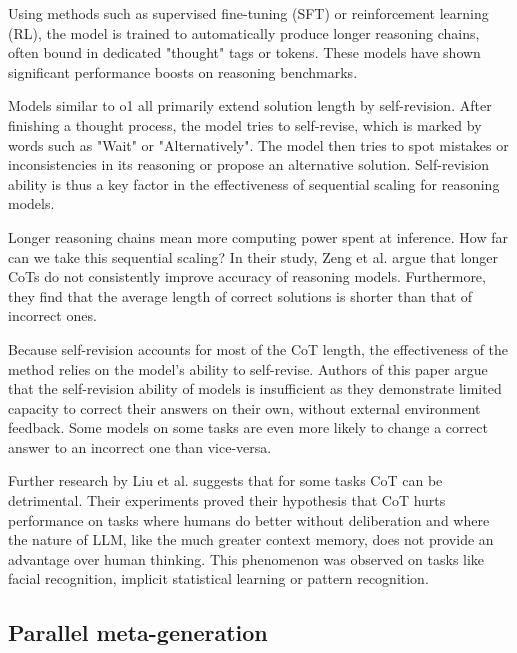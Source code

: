 Using methods such as supervised fine-tuning (SFT) or reinforcement learning (RL), the model is trained to
automatically produce longer reasoning chains, often bound in dedicated "thought" tags or tokens. 
These models have shown significant performance boosts on reasoning benchmarks\cite{openai2024openaio1card}\cite{deepseekai2025deepseekr1incentivizingreasoningcapability}.

Models similar to o1 all primarily extend solution length by self-revision\cite{zeng2025revisitingtesttimescalingo1like}.
After finishing a thought process, the model tries to self-revise, which is marked by words such as "Wait" or "Alternatively". 
The model then tries to spot mistakes or inconsistencies in its reasoning or propose an alternative solution. 
Self-revision ability is thus a key factor in the effectiveness of sequential scaling for reasoning models\cite{zeng2025revisitingtesttimescalingo1like}.

Longer reasoning chains mean more computing power spent at inference. How far can we take this sequential scaling?
In their study, Zeng et al.\cite{zeng2025revisitingtesttimescalingo1like} argue that longer CoTs do not consistently improve accuracy of reasoning models.
Furthermore, they find that the average length of correct solutions is shorter than that of incorrect ones. 

Because self-revision accounts for most of the CoT length, the effectiveness of the method relies on the model's ability to self-revise.
Authors of this paper argue that the self-revision ability of models is insufficient as they demonstrate limited capacity to correct their answers
on their own, without external environment feedback. Some models on some tasks are even more likely to change a correct answer to an incorrect one than vice-versa.

Further research by Liu et al.\cite{liu2024mindstepbystep} suggests that for some tasks CoT can be detrimental.
Their experiments proved their hypothesis that CoT hurts performance on tasks where humans do better without deliberation
and where the nature of LLM, like the much greater context memory, does not provide an advantage over human thinking. 
This phenomenon was observed on tasks like facial recognition, implicit statistical learning or pattern recognition.

\subsection{Parallel meta-generation}

